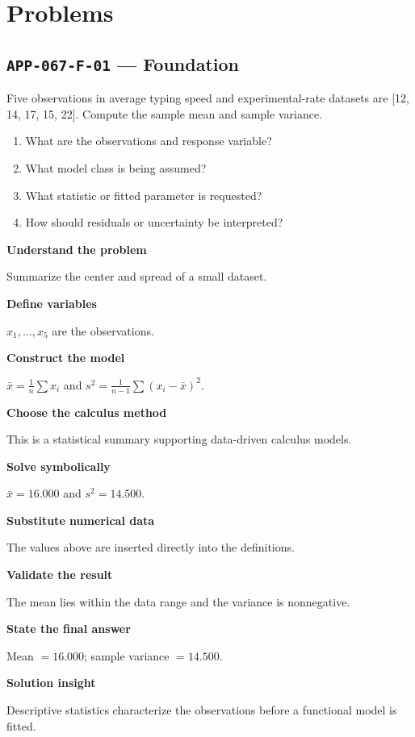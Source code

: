 \documentclass[11pt]{book}
\newcommand{\pid}[1]{\texttt{#1}}
\begin{document}
\section*{Problems}
\subsection*{\pid{APP-067-F-01} — Foundation}
\begin{problembox}
Five observations in average typing speed and experimental-rate datasets are [12, 14, 17, 15, 22]. Compute the sample mean and sample variance.
\end{problembox}
\begin{promptbox}\begin{enumerate}
\item What are the observations and response variable?
\item What model class is being assumed?
\item What statistic or fitted parameter is requested?
\item How should residuals or uncertainty be interpreted?
\end{enumerate}\end{promptbox}
\begin{solutionbox}
\textbf{Understand the problem}\par Summarize the center and spread of a small dataset.\par\medskip
\textbf{Define variables}\par $x_1,\dots,x_5$ are the observations.\par\medskip
\textbf{Construct the model}\par $\bar x=\frac1n\sum x_i$ and $s^2=\frac1{n-1}\sum(x_i-\bar x)^2$.\par\medskip
\textbf{Choose the calculus method}\par This is a statistical summary supporting data-driven calculus models.\par\medskip
\textbf{Solve symbolically}\par $\bar x=16.000$ and $s^2=14.500$.\par\medskip
\textbf{Substitute numerical data}\par The values above are inserted directly into the definitions.\par\medskip
\textbf{Validate the result}\par The mean lies within the data range and the variance is nonnegative.\par\medskip
\textbf{State the final answer}\par Mean $=16.000$; sample variance $=14.500$.\par\medskip
\textbf{Solution insight}\par Descriptive statistics characterize the observations before a functional model is fitted.\par\medskip
\end{solutionbox}
\end{document}
